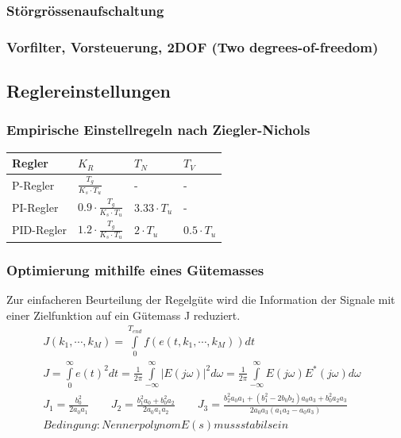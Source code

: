 \subsubsection{Störgrössenaufschaltung}


\subsubsection{Vorfilter, Vorsteuerung, 2DOF (Two degrees-of-freedom)}


\subsection{Reglereinstellungen}

\subsubsection{Empirische Einstellregeln nach Ziegler-Nichols}
\begin{tabularx}{0.5\textwidth}{|X||X|X|X|}
\hline
Regler & $K_R$ & $T_N$ & $T_V$ \\ \hline\hline
P-Regler & $\frac{T_g}{K_s\cdot T_u}$ & - & - \\ \hline
PI-Regler & $0.9\cdot\frac{T_g}{K_s\cdot T_u}$ & $3.33\cdot T_u$ & - \\ \hline
PID-Regler & $1.2\cdot\frac{T_g}{K_s\cdot T_u}$ & $2\cdot T_u$ & $0.5\cdot T_u$ \\ \hline
\end{tabularx}

\subsubsection{Optimierung mithilfe eines Gütemasses}

Zur einfacheren Beurteilung der Regelgüte wird die Information der Signale mit einer Zielfunktion auf ein
Gütemass J reduziert.
\begin{eqnarray}
J(k_1,\cdots,k_M)=\int\limits_{0}^{T_{end}}f(e(t,k_1,\cdots,k_M))dt\\
J=\int\limits_{0}^{\infty}e(t)^2dt= \frac{1}{2\pi} \int\limits_{-\infty}^{\infty}|E(j\omega)|^2d\omega= \frac{1}{2\pi} \int\limits_{-\infty}^{\infty}E(j\omega)E^{\ast}(j\omega)d\omega\\
J_1=\frac{b_0^2}{2a_0a_1} \qquad J_2=\frac{b_1^2a_0+b_0^2a_2}{2a_0a_1a_2} \qquad J_3=\frac{b_2^2a_0a_1+(b_1^2-2b_0b_2)a_0a_3+b_0^2a_2a_3}{2a_0a_3(a_1a_2-a_0a_3)} \qquad  \\
Bedingung: Nennerpolynom E(s) muss stabil sein
\end{eqnarray}

